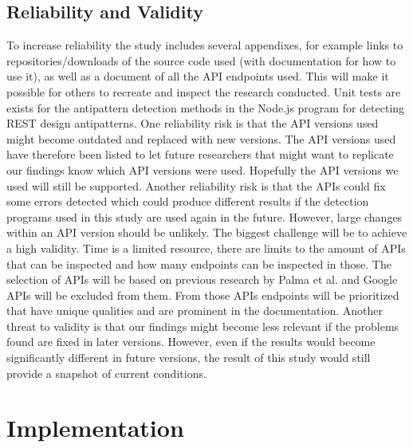 \documentclass[a4paper,12pt]{article}
\begin{document}
\subsection{Reliability and Validity}
To increase reliability the study includes several appendixes, for example links to repositories/downloads of the source code used (with documentation for how to use it), as well as a document of all the API endpoints used. This will make it possible for others to recreate and inspect the research conducted. Unit tests are exists for the antipattern detection methods in the Node.js program for detecting REST design antipatterns. 
One reliability risk is that the API versions used might become outdated and replaced with new versions. The API versions used have therefore been listed to let future researchers that might want to replicate our findings know which API versions were used. Hopefully the API versions we used will still be supported. 
Another reliability risk is that the APIs could fix some errors detected which could produce different results if the detection programs used in this study are used again in the future. However, large changes within an API version should be unlikely. 
The biggest challenge will be to achieve a high validity. Time is a limited resource, there are limits to the amount of APIs that can be inspected and how many endpoints can be inspected in those. The  selection of APIs will be based on previous research by Palma et al. \cite{linguistic} and Google APIs will be excluded from them. From those APIs endpoints will be prioritized that have unique qualities and are prominent in the documentation. 
Another threat to validity is that our findings might become less relevant if the problems found are fixed in later versions. However, even if the results would become significantly different in future versions, the result of this study would still provide a snapshot of current conditions. 

\newpage

\section{Implementation}
\end{document}
